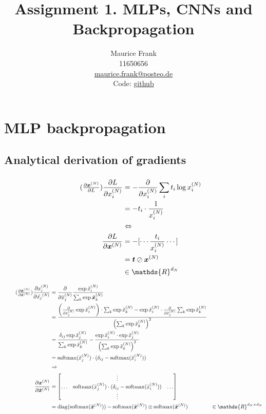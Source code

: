 \documentclass{article}
\title{Assignment 1. MLPs, CNNs and Backpropagation}
\author{%
  Maurice Frank\\
  11650656\\
  \href{mailto:maurice.frank@posteo.de}{maurice.frank@posteo.de} \\
  Code: \href{https://github.com/morris-frank/uvadlc_practicals_2019/tree/master/assignment_1/code}{github}
}
\newcommand\bM[1]{\ensuremath{\begin{bmatrix}#1\end{bmatrix}}}
\newcommand\·{\ensuremath{\cdot}}
\newcommand\…{\ensuremath{\dots}}
\renewcommand\t{\ensuremath{\times}}
\DeclareMathOperator{\soft}{softmax}
\DeclareMathOperator{\diag}{diag}
\newcommand{\⇔}{\ensuremath{\Leftrightarrow}}
\newcommand{\⇐}{\ensuremath{\Rightarrow}}
\newcommand{\⇒}{\ensuremath{\Leftarrow}}
\newcommand\f[2]{\ensuremath{\frac{#1}{#2}}}
\newcommand\pf[2]{\ensuremath{\frac{\partial {#1}}{\partial {#2}}}}
\newcommand*{\B}[1]{\ifmmode\bm{#1}\else\textbf{#1}\fi}
\newcommand\1{\ensuremath{\mathds{1}}}
\newcommand\ℝ{\ensuremath{\mathds{R}}}
\begin{document}
\maketitle
\section{MLP backpropagation}
\subsection{Analytical derivation of gradients}
\subsubsection{}
\begin{align*}
  \tag{$\pf{\B{x}^{(N)}}{L}$}
  \pf{L}{x_i^{(N)}}
  &= -\pf{}{x_i^{(N)}}\sum_i t_i \log x_i^{(N)}\\
  &= -t_i\·\f{1}{x_i^{(N)}}\\
  &\⇔\\
  \pf{L}{\B{x}^{(N)}}
  &= -[\dotsb \f{t_i}{x_i^{(N)}}\dotsb]\\
  &= \B{t}\oslash\B{x}^{(N)}\\
  &\in\ℝ^{d_N}
\end{align*}

\begin{align*}
  \tag{$\pf{\B{x}^{(N)}}{\tilde{\B{x}}^{(N)}}$}
  \pf{x_i^{(N)}}{\tilde{x_j}^{(N)}}
  &= \pf{}{\tilde{x}_j^{(N)}}\f{\exp{\tilde{x}_i^{(N)}}}{\sum_k \exp{\tilde{\B{x}}_k^{(N)}}}\\
  &= \f{\left(\pf{}{\tilde{x}^{(N)}_j}\exp{\tilde{x}^{(N)}_i}\right)\·\sum_k\exp{\tilde{x}^{(N)}_k} - \exp{\tilde{x}^{(N)}_i}\·\pf{}{\tilde{x}^{(N)}_j}\sum_k\exp{\tilde{x}^{(N)}_k}}{\left(\sum_k\exp{\tilde{x}^{(N)}_k}\right)^2}\\
  &= \f{\delta_{ij}\exp{\tilde{x}^{(N)}_j}}{\sum_k\exp{\tilde{x}^{(N)}_k}} - \f{\exp{\tilde{x}^{(N)}_i}\·\exp{\tilde{x}^{(N)}_j}}{\left(\sum_k\exp{\tilde{x}^{(N)}_k}\right)^2}\\
  &= \soft(\tilde{x}^{(N)}_j)\·(\delta_{ij} - \soft(\tilde{x}^{(N)}_i))\\
  &\Rightarrow\\
  \pf{\B{x}^{(N)}}{\tilde{\B{x}}^{(N)}} &= \bM{& \vdots &\\\hdots & \soft(\tilde{x}^{(N)}_j)\·(\delta_{ij} - \soft(\tilde{x}^{(N)}_i)) & \hdots\\ & \vdots &}\\
  &= \diag(\soft(\tilde{\B{x}}^{(N)})) -\soft(\tilde{\B{x}}^{(N)})\otimes \soft(\tilde{\B{x}}^{(N)})
  &\in\ℝ^{d_N\t d_N}
\end{align*}
\end{document}
